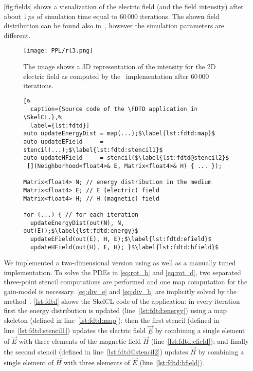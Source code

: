\autoref{fig:fields} shows a visualization of the electric field (and the field intensity) after about  $1\,ps$ of simulation time equal to $60\,000$ iterations.
The shown field distribution can be found also in~\cite{Sebbah2002, Yamilov2005}, however the simulation parameters are different.

\begin{figure}[t]
    \centering
    \texttt{[image: PPL/rl3.png]}
    \caption[A 3D representation of the inensity of the 2D electric field as computed by the \SkelCL\ \FDTD implementation.]%
            {\small The image shows a 3D representation of the intensity for the 2D electric field as computed by the \SkelCL\ \FDTD implementation after $60\,000$ iterations.}
    \label{fig:fields}
\end{figure}

\begin{figure}[tbp]
\begin{lstlisting}[%
  caption={Source code of the \FDTD application in \SkelCL.},%
  label={lst:fdtd}]
auto updateEnergyDist = map(...);$\label{lst:fdtd:map}$
auto updateEField     = stencil(...);$\label{lst:fdtd:stencil1}$
auto updateHField     = stencil($\label{lst:fdtd@stencil2}$
 [](Neighborhood<float4>& E, Matrix<float4>& H) { ... });

Matrix<float4> N; // energy distribution in the medium
Matrix<float4> E; // E (electric) field
Matrix<float4> H; // H (magnetic) field

for (...) { // for each iteration
  updateEnergyDist(out(N), N, out(E));$\label{lst:fdtd:energy}$
  updateEField(out(E), H, E);$\label{lst:fdtd:efield}$
  updateHField(out(H), E, H); }$\label{lst:fdtd:hfield}$
\end{lstlisting}
\end{figure}

We implemented a two-dimensional version using \SkelCL as well as a manually tuned \OpenCL implementation.
To solve the PDEs in \autoref{eq:rot_h} and \autoref{eq:rot_d}, two separated three-point stencil computations are performed and one map computation for the gain-model is necessary.
\autoref{eq:div_e} and \autoref{eq:div_h} are implicitly solved by the \FDTD method~\cite{Yee1966}.
\autoref{lst:fdtd} shows the SkelCL code of the application:
in every iteration first the energy distribution is updated (line~\ref{lst:fdtd:energy}) using a map skeleton (defined in line~\ref{lst:fdtd:map});
then the first stencil (defined in line~\ref{lst:fdtd:stencil1}) updates the electric field $\vec{E}$ by combining a single element of $\vec{E}$ with three elements of the magnetic field $\vec{H}$ (line~\ref{lst:fdtd:efield});
and finally the second stencil (defined in line~\ref{lst:fdtd@stencil2}) updates $\vec{H}$ by combining a single element of $\vec{H}$ with three elements of $\vec{E}$ (line~\ref{lst:fdtd:hfield}).

